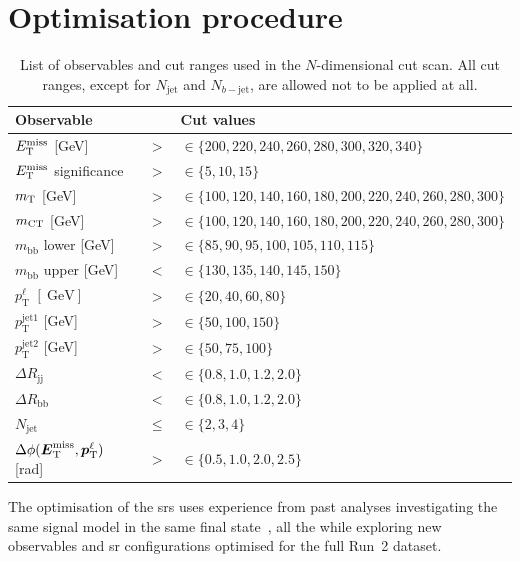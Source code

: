 \section{Optimisation procedure}

\begin{table}
	\centering
	\small
	\setlength\heavyrulewidth{0.2ex}
	\caption[Cut ranges used in the $N$-dimensional cut scan]{List of observables and cut ranges used in the $N$-dimensional cut scan. All cut ranges, except for $N_\mathrm{jet}$ and $N_{b-\mathrm{jet}}$, are allowed not to be applied at all.}
	\begin{tabular} {l c l}
		\toprule
		Observable &  & Cut values \\ 
		\midrule
		$E_{\textrm{T}}^{\textrm{miss}}$ [GeV]& $>$ & $\in \{200,220,240,260,280,300,320,340\}$ \\
		$E_{\textrm{T}}^{\textrm{miss}}$ significance & $>$ & $\in \{5,10,15\}$ \\
		$m_{\textrm{T}}$ [GeV]& $>$ & $\in \{100, 120, 140,160,180,200,220,240,260,280, 300\}$ \\
		$m_{\textrm{CT}}$ [GeV]& $>$ & $\in \{100, 120, 140,160,180,200,220,240,260,280, 300\}$ \\
		$m_\mathrm{bb}$ lower [GeV]& $>$ & $\in \{85,90,95,100,105,110,115\}$ \\
		$m_\mathrm{bb}$ upper [GeV]& $<$ & $\in \{130,135,140,145,150\}$ \\
		$p_\textrm{T}^\ell$ $[\SI{}{\GeV}]$& $>$ & $\in \{20, 40, 60, 80\}$ \\
		$p_\textrm{T}^\mathrm{jet1}$ [GeV]& $>$ & $\in \{50, 100, 150\}$ \\
		$p_\textrm{T}^\mathrm{jet2}$ [GeV]& $>$ & $\in \{50, 75, 100\}$ \\	
		$\Delta R_\mathrm{jj}$ & $<$ & $\in \{0.8,1.0,1.2,2.0\}$ \\
		$\Delta R_\mathrm{bb}$ & $<$ & $\in \{0.8,1.0,1.2,2.0\}$ \\
		$N_\mathrm{jet}$ & $\leq$ & $\in \{2,3,4\}$ \\			
		$\Delta\phi (\boldsymbol{E}_{\textrm{T}}^{\textrm{miss}},\boldsymbol{p}_{\textrm{T}}^\ell )$ [rad]& $>$ & $\in \{0.5,1.0,2.0,2.5\}$ \\
		\bottomrule					
	\end{tabular}
	\label{tab:cut_scan}   
\end{table}

The optimisation of the \glspl{sr} uses experience from past analyses investigating the same signal model in the same final state~\cite{SUSY-2013-23,SUSY-2017-01}, all the while exploring new observables and \gls{sr} configurations optimised for the full Run~2 dataset. 

